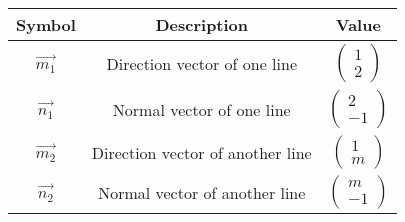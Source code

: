 \begin{tabular}{|c|c|c|}
    \hline
        \textbf{Symbol} &\textbf{Description}&\textbf{Value}  \\
        \hline
         $\vec{m_1}$&Direction vector of one line&$\begin{pmatrix}
             1\\2
         \end{pmatrix}$\\
         \hline
         $\vec{n_1}$&Normal vector of one line&$\begin{pmatrix}
             2\\-1
         \end{pmatrix}$\\
         \hline
        $\vec{m_2}$&Direction vector of another line&$\begin{pmatrix}
             1\\m
         \end{pmatrix}$\\
         \hline
          $\vec{n_2}$&Normal vector of another line&$\begin{pmatrix}
             m\\-1
         \end{pmatrix}$\\
         \hline
    \end{tabular}
